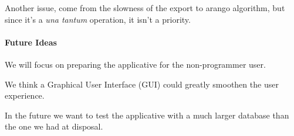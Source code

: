 \documentclass[11pt,twocolumn]{article}
\begin{document}
Another issue, come from the slowness of the export to arango algorithm, but since it's a \textit{una tantum} operation, it isn't a priority.

\paragraph{Future Ideas}

We will focus on preparing the applicative for the non-programmer user.

We think a Graphical User Interface (GUI) could greatly smoothen the user experience.

In the future we want to test the applicative with a much larger database than the one we had at disposal.

\twocolumn[
\begin{@twocolumnfalse}


\end{@twocolumnfalse}
]
\end{document}
